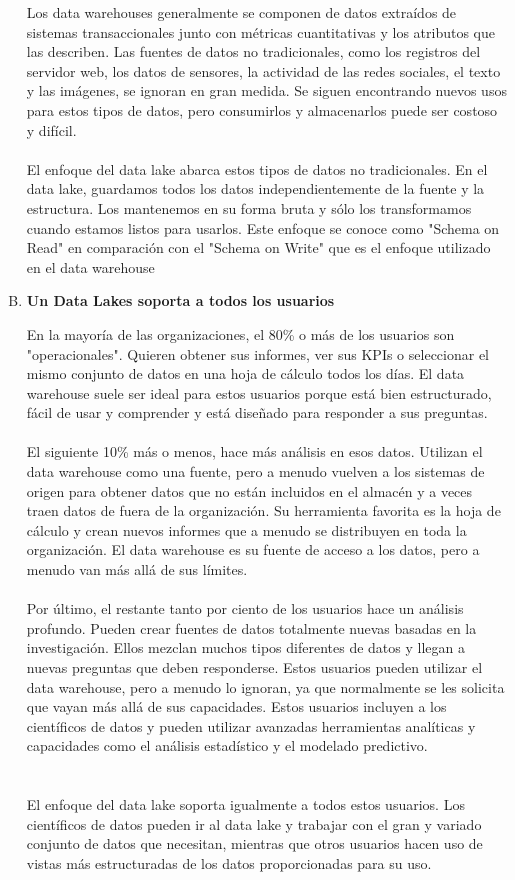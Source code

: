 \documentclass[11pt,a4paper]{article}
\begin{document}
\begin{enumerate}[A.]
				Los data warehouses generalmente se componen de datos extraídos de sistemas transaccionales junto con métricas cuantitativas y los atributos que las describen. Las fuentes de datos no tradicionales, como los registros del servidor web, los datos de sensores, la actividad de las redes sociales, el texto y las imágenes, se ignoran en gran medida. Se siguen encontrando nuevos usos para estos tipos de datos, pero consumirlos y almacenarlos puede ser costoso y difícil.\\
				\\
				El enfoque del data lake abarca estos tipos de datos no tradicionales. En el data lake, guardamos todos los datos independientemente de la fuente y la estructura. Los mantenemos en su forma bruta y sólo los transformamos cuando estamos listos para usarlos. Este enfoque se conoce como "Schema on Read" en comparación con el "Schema on Write" que es el enfoque utilizado en el data warehouse
				\item \textbf{Un Data Lakes soporta a todos los usuarios}
				
				En la mayoría de las organizaciones, el 80\% o más de los usuarios son "operacionales". Quieren obtener sus informes, ver sus KPIs o seleccionar el mismo conjunto de datos en una hoja de cálculo todos los días. El data warehouse suele ser ideal para estos usuarios porque está bien estructurado, fácil de usar y comprender y está diseñado para responder a sus preguntas.\\
				\\
				El siguiente 10\% más o menos, hace más análisis en esos datos. Utilizan el data warehouse como una fuente, pero a menudo vuelven a los sistemas de origen para obtener datos que no están incluidos en el almacén y a veces traen datos de fuera de la organización. Su herramienta favorita es la hoja de cálculo y crean nuevos informes que a menudo se distribuyen en toda la organización. El data warehouse es su fuente de acceso a los datos, pero a menudo van más allá de sus límites.\\
\\
				Por último, el restante tanto por ciento de los usuarios hace un análisis profundo. Pueden crear fuentes de datos totalmente nuevas basadas en la investigación. Ellos mezclan muchos tipos diferentes de datos y llegan a nuevas preguntas que deben responderse. Estos usuarios pueden utilizar el data warehouse, pero a menudo lo ignoran, ya que normalmente se les solicita que vayan más allá de sus capacidades. Estos usuarios incluyen a los científicos de datos y pueden utilizar avanzadas herramientas analíticas y capacidades como el análisis estadístico y el modelado predictivo.\\
				\\
				\\
					El enfoque del data lake soporta igualmente a todos estos usuarios. Los científicos de datos pueden ir al data lake y trabajar con el gran y variado conjunto de datos que necesitan, mientras que otros usuarios hacen uso de vistas más estructuradas de los datos proporcionadas para su uso.


\end{enumerate}
\end{document}
